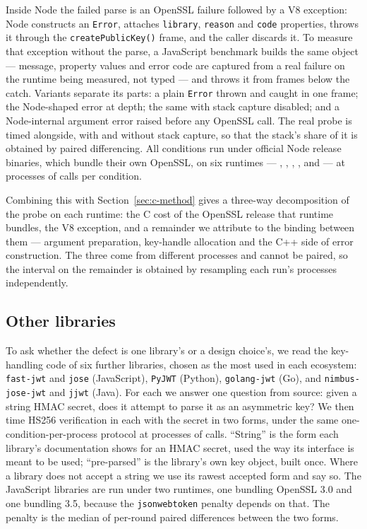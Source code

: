 \documentclass[pdflatex,sn-basic,twocolumn]{sn-jnl}%
\newcommand{\LibraryName}{\texttt{jsonwebtoken}}
\begin{document}
Inside Node the failed parse is an OpenSSL failure followed by a V8 exception:
Node constructs an \texttt{Error}, attaches \texttt{library}, \texttt{reason}
and \texttt{code} properties, throws it through the \texttt{createPublicKey()}
frame, and the caller discards it. To measure that exception without the
parse, a JavaScript benchmark builds the same object --- message, property
values and error code are captured from a real failure on the runtime being
measured, not typed --- and throws it from \ExcDepth{} frames below the catch.
Variants separate its parts: a plain \texttt{Error} thrown and caught in one
frame; the Node-shaped error at depth; the same with stack capture disabled;
and a Node-internal argument error raised before any OpenSSL call. The real
probe is timed alongside, with and without stack capture, so that the stack's
share of it is obtained by paired differencing. All conditions run under
official Node release binaries, which bundle their own OpenSSL, on six
runtimes --- \RtEighteenLiteral, \RtTwentyLiteral, \RtTwentyTwoLiteral,
\RtTwentyThreeLiteral, \RtTwentyFourLiteral{} and \RtTwentySixLiteral{} --- at
\ExcInvocations{} processes of \ExcCallsPerInvocation{} calls per condition.

Combining this with Section~\ref{sec:c-method} gives a three-way decomposition
of the probe on each runtime: the C cost of the OpenSSL release that runtime
bundles, the V8 exception, and a remainder we attribute to the binding between
them --- argument preparation, key-handle allocation and the C++ side of error
construction. The three come from different processes and cannot be paired, so
the interval on the remainder is obtained by resampling each run's processes
independently.

\subsection{Other libraries}\label{sec:xlib-method}

To ask whether the defect is one library's or a design choice's, we read the
key-handling code of six further libraries, chosen as the most used in each
ecosystem: \texttt{fast-jwt} and \texttt{jose} (JavaScript), \texttt{PyJWT}
(Python), \texttt{golang-jwt} (Go), and \texttt{nimbus-jose-jwt} and
\texttt{jjwt} (Java). For each we answer one question from source: given a
string HMAC secret, does it attempt to parse it as an asymmetric key? We then
time HS256 verification in each with the secret in two forms, under the same
one-condition-per-process protocol at \XlibInvocations{} processes of
\XlibCallsPerInvocation{} calls. ``String'' is the form each library's
documentation shows for an HMAC secret, used the way its interface is meant to
be used; ``pre-parsed'' is the library's own key object, built once. Where a
library does not accept a string we use its rawest accepted form and say so.
The JavaScript libraries are run under two runtimes, one bundling OpenSSL 3.0
and one bundling 3.5, because the \LibraryName{} penalty depends on that. The
penalty is the median of per-round paired differences between the two forms.
\end{document}
